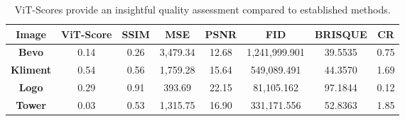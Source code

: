 \begin{table}[H]
    \begin{center}
    \begin{tabular}{|c|c|c|c|c|c|c|c|}
    \hline
    \textbf{Image}	& \textbf{ViT-Score} & \textbf{SSIM} & \textbf{MSE} & \textbf{PSNR} & \textbf{FID}  & \textbf{BRISQUE} & \textbf{CR}\\
    \hline
    \textbf{Bevo}	 & 0.14 & 0.26 & 3,479.34  &  12.68  &  1,241,999.901  &  39.5535 & 0.75 \\
    \textbf{Kliment} & 0.54 & 0.56 & 1,759.28 & 15.64  &  549,089.491 & 44.3570 & 1.69\\
    \textbf{Logo}	 & 0.29 & 0.91 & 393.69 & 22.15 &  81,105.162 & 97.1844 & 0.12 \\
    \textbf{Tower}   & 0.03 & 0.53 & 1,315.75 & 16.90 &  331,171.556 & 52.8363 & 1.85\\\hline
    
    \end{tabular}
    \caption[Summary of Results]{ViT-Scores provide an insightful quality assessment compared to established methods.}
    \end{center}
    \end{table}
